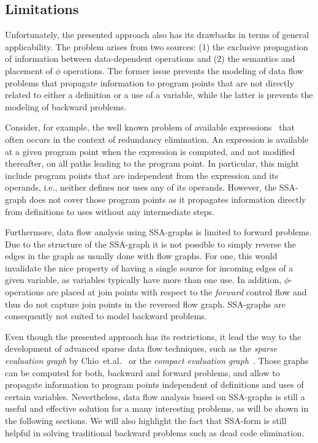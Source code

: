\subsection{Limitations}

Unfortunately, the presented approach also has its drawbacks in terms of
general applicability. The problem arises from two sources: (1) the exclusive
propagation of information between data-dependent operations and (2) the
semantics and placement of $\phi$ operations. The former issue prevents the
modeling of data flow problems that propagate information to program points that
are not directly related to either a definition or a use of a variable, while
the latter is prevents the modeling of backward problems.

Consider, for example, the well known problem of available
expressions~\cite{novillo:bib:NNH99} that often occurs in the context of
redundancy elimination. An expression is available at a given program point when
the expression is computed, and not modified thereafter, on all paths leading to
the program point. In particular, this might include program points that are
independent from the expression and its operands, i.e., neither defines nor uses
any of its operands. However, the SSA-graph does not cover those program points
as it propagates information directly from definitions to uses without any
intermediate steps.

Furthermore, data flow analysis using SSA-graphs is limited to forward problems.
Due to the structure of the SSA-graph it is not possible to simply reverse the
edges in the graph as usually done with flow graphs. For one, this would
invalidate the nice property of having a single source for incoming edges of a
given variable, as variables typically have more than one use. In addition,
$\phi$-operations are placed at join points with respect to the \emph{forward}
control flow and thus do not capture join points in the reversed flow graph.
SSA-graphs are consequently not suited to model backward problems.

Even though the presented approach has its restrictions, it lead the way to the
development of advanced sparse data flow techniques, such as the \emph{sparse
evaluation graph} by Chio~et.al.~\cite{novillo:bib:CCF91} or the \emph{compact
evaluation graph}~\cite{novillo:bib:R02}. Those graphs can be computed for both,
backward and forward problems, and allow to propagate information to program
points independent of definitions and uses of certain variables. Nevertheless,
data flow analysis based on SSA-graphs is still a useful and effective solution
for a many interesting problems, as will be shown in the following sections. We
will also highlight the fact that SSA-form is still helpful in solving
traditional backward problems such as dead code elimination.

